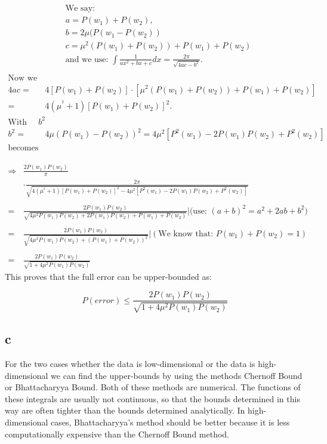 \begin{align*}
&\text{We say: }\\
&a=P(w_{1})+P(w_{2}), \\
&b=2\mu(P(w_{1}-P(w_{2}))\\ 
&c=\mu^{2}(P(w_{1})+P(w_{2}))+P(w_{1})+P(w_{2})\\
&\text{and we use: } \int\frac{1}{ax^2+bx+c}dx=\frac{2\pi}{\sqrt{4ac-b^{2}}}.\\
\end{align*}
\begin{align*}
\text{Now we take a look at 4ac:}\\
4ac=&4[P(w_{1})+P(w_{2})]\cdot[\mu^{2}(P(w_{1})+P(w_{2}))+P(w_{1})+P(w_{2})]\\
=&4(\mu^{^2}+1)[P(w_{1})+P(w_{2})]^{2}.\\
\text{With that and the result of $b^{2}$}\\
b^{2}=&4\mu(P(w_{1})-P(w_{2}))^{2}= 4\mu^{2}[P^{2}(w_{1})-2P(w_{1})P(w_{2})+P^{2}(w_{2})]\\
\text{becomes the integral above to:}
\end{align*}

\begin{align*}
\Rightarrow&\frac{2P(w_{1})P(w_{2})}{\pi}\\
&\cdot\frac{2\pi}{\sqrt{4(\mu^{^2}+1)[P(w_{1})+P(w_{2})]^{2}-4\mu^{2}[P^{2}(w_{1})-2P(w_{1})P(w_{2})+P^{2}(w_{2})]}}\\
\\
=&\frac{2P(w_{1})P(w_{2})}{\sqrt{4\mu^{2}P(w_{1})P(w_{2})+2P(w_{1})P(w_{2})+P(w_{1})+P(w_{2})}}\vert(\text{use: $(a+b)^{2}=a^{2}+2ab+b^{2}$)}\\
\\
=&\frac{2P(w_{1})P(w_{2})}{\sqrt{4\mu^{2}P(w_{1})P(w_{2})+(P(w_{1})+P(w_{2}))^{2}}}\vert(\text{We know that: $P(w_{1})+P(w_{2})=1$})\\
\\
=&\frac{2P(w_{1})P(w_{2})}{\sqrt{1+4\mu^{2}P(w_{1})P(w_{2})}}
\end{align*}
This proves that the full error can be upper-bounded as:

\begin{center}
\begin{equation}
    P(error)\leq\frac{2P(w_{1})P(w_{2})}{\sqrt{1+4\mu^{2}P(w_{1})P(w_{2})}}
\end{equation}
\end{center}




\subsection{c}
For the two cases whether the data is low-dimensional or the data is high-dimensional we can find the upper-bounds by using the methods Chernoff Bound or Bhattacharyya Bound. Both of these methods are numerical. The functions of these integrals are usually not continuous, so that the bounds determined in this way are often tighter than the bounds determined analytically. In high-dimensional cases, Bhattacharyya's method should be better because it is less computationally expensive than the Chernoff Bound method.  
\newpage
